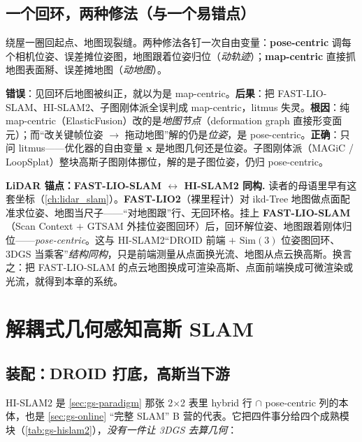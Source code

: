 \subsection{一个回环，两种修法（与一个易错点）}

绕屋一圈回起点、地图现裂缝。两种修法各钉一次自由变量：\textbf{pose-centric} 调每个相机位姿、误差摊位姿图，地图跟着位姿归位（\emph{动轨迹}）；\textbf{map-centric} 直接抓地图表面掰、误差摊地图（\emph{动地图}）。

\begin{pitfall}[“改关键帧来改地图” $=$ pose-centric，不是 map-centric]
\textbf{错误}：见回环后地图被纠正，就以为是 map-centric。\textbf{后果}：把 FAST-LIO-SLAM、HI-SLAM2、子图刚体派全误判成 map-centric，litmus 失灵。\textbf{根因}：纯 map-centric（ElasticFusion）改的是\emph{地图节点}（deformation graph 直接形变面元）；而“改关键帧位姿 $\to$ 拖动地图”解的仍是\emph{位姿}，是 pose-centric。\textbf{正确}：只问 litmus——优化器的自由变量 $\mathbf x$ 是地图几何还是位姿。子图刚体派（MAGiC / LoopSplat）整块高斯子图刚体挪位，解的是子图位姿，仍归 pose-centric。
\end{pitfall}

\begin{note}
\textbf{LiDAR 锚点：FAST-LIO-SLAM $\leftrightarrow$ HI-SLAM2 同构.}\;
读者的母语里早有这套坐标（\cref{ch:lidar_slam}）。\textbf{FAST-LIO2}（裸里程计）对 ikd-Tree 地图做点面配准求位姿、地图当尺子——“对地图跟”行、无回环格。挂上 \textbf{FAST-LIO-SLAM}（Scan Context $+$ GTSAM 外挂位姿图回环）后，回环解位姿、地图跟着刚体归位——\emph{pose-centric}。这与 HI-SLAM2“DROID 前端 $+$ $\mathrm{Sim}(3)$ 位姿图回环、3DGS 当乘客”\emph{结构同构}，只是前端测量从点面换光流、地图从点云换高斯。换言之：把 FAST-LIO-SLAM 的点云地图换成可渲染高斯、点面前端换成可微渲染或光流，就得到本章的系统。
\end{note}

\section{解耦式几何感知高斯 SLAM}
\label{sec:gs-decoupled}

\subsection{装配：DROID 打底，高斯当下游}

HI-SLAM2 是 \cref{sec:gs-paradigm} 那张 2$\times$2 表里 hybrid 行 $\cap$ pose-centric 列的本体，也是 \cref{sec:gs-online} “完整 SLAM” B 营的代表。它把四件事分给四个成熟模块（\cref{tab:gs-hislam2}），\emph{没有一件让 3DGS 去算几何}：


